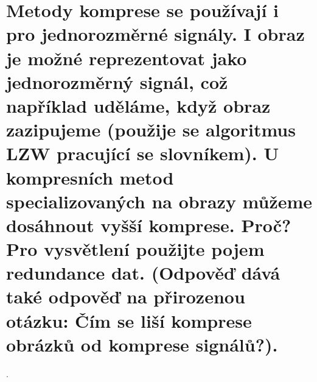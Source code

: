 \section{Metody komprese se používají i pro jednorozměrné signály. I obraz je možné reprezentovat jako jednorozměrný 
signál, což například uděláme, když obraz zazipujeme (použije se algoritmus LZW pracující se slovníkem). U kompresních 
metod specializovaných na obrazy můžeme dosáhnout vyšší komprese. Proč? Pro vysvětlení použijte pojem redundance dat. 
(Odpověď dává také odpověď na přirozenou otázku: Čím se liší komprese obrázků od komprese signálů?).}.
